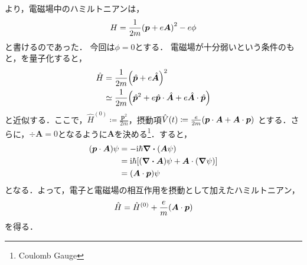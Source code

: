 \documentclass{report}
\begin{document}
  より，電磁場中のハミルトニアンは，
  \begin{align}
    H = \frac{1}{2m}\qty(\bm{p} + e\bm{A})^2 - e\phi\label{hamiltonian-in-electro-magnetic-field-cm-re}
  \end{align}
  と書けるのであった．
  今回は$\phi = 0$とする．
  電磁場が十分弱いという条件のもと，を量子化すると，
  \begin{align}
    \hat{H} &= \frac{1}{2m}\qty(\hat{\bm{p}} + e\hat{\bm{A}})^2 \\
    &\simeq \frac{1}{2m}\qty(\hat{\bm{p}}^2 + e\hat{\bm{p}}\cdot\hat{\bm{A}} + e\hat{\bm{A}} \cdot \hat{\bm{p}})\\
  \end{align}
  と近似する．ここで，$\hat{H}^{(0)} \coloneqq \frac{\bm{p}^2}{2m}$，摂動項$\hat{V}(t) \coloneqq \frac{e}{2m} \qty(\bm{p}\cdot\bm{A} + \bm{A} \cdot \bm{p})$
  とする．さらに，$\div\bm{A} = 0$となるように$\bm{A}$を決める\footnote{Coulomb Gauge}．すると，
  \begin{align}
    \qty(\bm{p} \cdot \bm{A})\psi &= -\mathrm{i}\hbar \div\qty(\bm{A} \psi)\\
    &= \mathrm{i}\hbar\qty[\qty(\div\bm{A}) \psi + \bm{A} \cdot \qty(\grad \psi)]\\
    &= \qty(\bm{A} \cdot \bm{p}) \psi
  \end{align}
  となる．よって，電子と電磁場の相互作用を摂動として加えたハミルトニアン，
  \begin{align}
    \hat{H} = \hat{H}^{(0)} + \frac{e}{m}\qty(\bm{A} \cdot \bm{p})
  \end{align}
  を得る．
\end{document}
